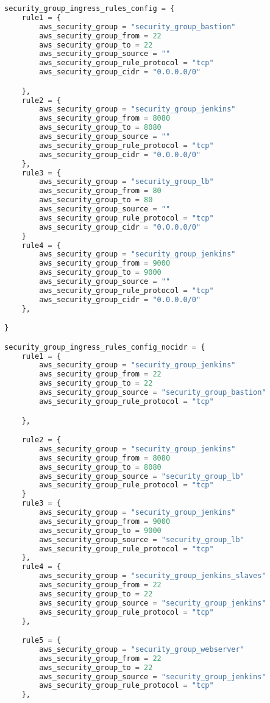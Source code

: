 \begin{lstlisting}[language=terraform]
  security_group_ingress_rules_config = {
    rule1 = {
        aws_security_group = "security_group_bastion"
        aws_security_group_from = 22
        aws_security_group_to = 22
        aws_security_group_source = ""
        aws_security_group_rule_protocol = "tcp"
        aws_security_group_cidr = "0.0.0.0/0"

    },
    rule2 = {
        aws_security_group = "security_group_jenkins"
        aws_security_group_from = 8080
        aws_security_group_to = 8080
        aws_security_group_source = ""
        aws_security_group_rule_protocol = "tcp"
        aws_security_group_cidr = "0.0.0.0/0"
    },
    rule3 = {
        aws_security_group = "security_group_lb"
        aws_security_group_from = 80
        aws_security_group_to = 80
        aws_security_group_source = ""
        aws_security_group_rule_protocol = "tcp"
        aws_security_group_cidr = "0.0.0.0/0"
    }
    rule4 = {
        aws_security_group = "security_group_jenkins"
        aws_security_group_from = 9000
        aws_security_group_to = 9000
        aws_security_group_source = ""
        aws_security_group_rule_protocol = "tcp"
        aws_security_group_cidr = "0.0.0.0/0"
    },

}

security_group_ingress_rules_config_nocidr = {
    rule1 = {
        aws_security_group = "security_group_jenkins"
        aws_security_group_from = 22
        aws_security_group_to = 22
        aws_security_group_source = "security_group_bastion"
        aws_security_group_rule_protocol = "tcp"

    },

    rule2 = {
        aws_security_group = "security_group_jenkins"
        aws_security_group_from = 8080
        aws_security_group_to = 8080
        aws_security_group_source = "security_group_lb"
        aws_security_group_rule_protocol = "tcp"
    }
    rule3 = {
        aws_security_group = "security_group_jenkins"
        aws_security_group_from = 9000
        aws_security_group_to = 9000
        aws_security_group_source = "security_group_lb"
        aws_security_group_rule_protocol = "tcp"
    },
    rule4 = {
        aws_security_group = "security_group_jenkins_slaves"
        aws_security_group_from = 22
        aws_security_group_to = 22
        aws_security_group_source = "security_group_jenkins"
        aws_security_group_rule_protocol = "tcp"
    },

    rule5 = {
        aws_security_group = "security_group_webserver"
        aws_security_group_from = 22
        aws_security_group_to = 22
        aws_security_group_source = "security_group_jenkins"
        aws_security_group_rule_protocol = "tcp"
    },


\end{lstlisting}
